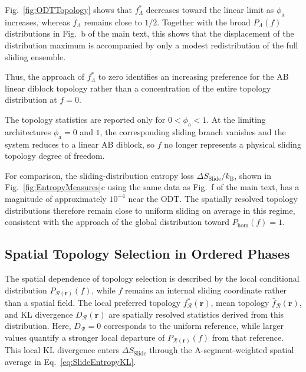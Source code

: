 \documentclass[journal=mamobx,manuscript=article]{achemso}
\begin{document}
	Fig.~\ref{fig:ODTTopology} shows that $f_\Lambda^\ast$ decreases toward the linear limit as $\phi_{\mathrm a}$ increases, whereas $\bar f_\Lambda$ remains close to $1/2$.
	Together with the broad $P_\Lambda(f)$ distributions in Fig.~b of the main text, this shows that the displacement of the distribution maximum is accompanied by only a modest redistribution of the full sliding ensemble.
	
	Thus, the approach of $f_\Lambda^\ast$ to zero identifies an increasing preference for the AB linear diblock topology rather than a concentration of the entire topology distribution at $f=0$.
	
	The topology statistics are reported only for $0<\phi_{\mathrm a}<1$.
	At the limiting architectures $\phi_{\mathrm a}=0$ and $1$, the corresponding sliding branch vanishes and the system reduces to a linear AB diblock, so $f$ no longer represents a physical sliding topology degree of freedom.


	For comparison, the sliding-distribution entropy loss $\Delta S_{\mathrm{Slide}}/k_{\mathrm B}$, shown in Fig.~\ref{fig:EntropyMeasures}c using the same data as Fig.~f of the main text, has a magnitude of approximately $10^{-4}$ near the ODT.
	The spatially resolved topology distributions therefore remain close to uniform sliding on average in this regime, consistent with the approach of the global distribution toward $P_{\mathrm{hom}}(f)=1$.


	\subsection{Spatial Topology Selection in Ordered Phases}
	\label{subsec:TopologyStatisticsSpatial}

	The spatial dependence of topology selection is described by the local conditional distribution $P_{\mathcal R(\bm r)}(f)$, while $f$ remains an internal sliding coordinate rather than a spatial field.
	The local preferred topology $f_{\mathcal R}^\ast(\bm r)$, mean topology $\bar f_{\mathcal R}(\bm r)$, and KL divergence $D_{\mathcal R}(\bm r)$ are spatially resolved statistics derived from this distribution.
	Here, $D_{\mathcal R}=0$ corresponds to the uniform reference, while larger values quantify a stronger local departure of $P_{\mathcal R(\bm r)}(f)$ from that reference.
	This local KL divergence enters $\Delta S_{\mathrm{Slide}}$ through the A-segment-weighted spatial average in Eq.~\eqref{eq:SlideEntropyKL}.
\end{document}
